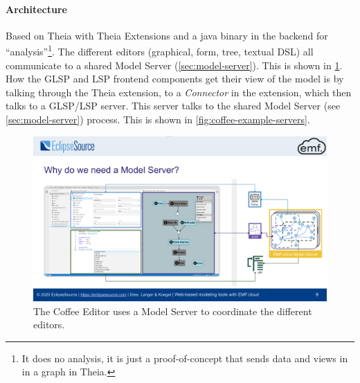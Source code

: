 \paragraph*{Architecture}
Based on Theia with Theia Extensions and a java binary in the backend for ``analysis''\footnote{It does no analysis, it is just a proof-of-concept that sends data and views in in a graph in Theia.}.
The different editors (graphical, form, tree, textual DSL) all communicate to a shared Model Server (\cref{sec:model-server}).
This is shown in \cref{fig:coffee-maker-model-server}.
How the \gls{GLSP} and \gls{LSP} frontend components get their view of the model is by talking through the Theia extension, to a \emph{Connector} in the extension, which then talks to a \gls{GLSP}/\gls{LSP} server.
This server talks to the shared Model Server (see \cref{sec:model-server}) process. This is shown in \cref{fig:coffee-example-servers}.

\begin{figure}[!htb] 
  \centering
  \includegraphics[width=\textwidth]{figures/coffee-maker-architecture.png}
  \caption[Coffee Editor IDE Model Server]{The Coffee Editor uses a Model Server to coordinate the different editors.~\cite[p.~9]{philiplangerWebbasedModelingTools2020}}\label{fig:coffee-maker-model-server}
\end{figure}

